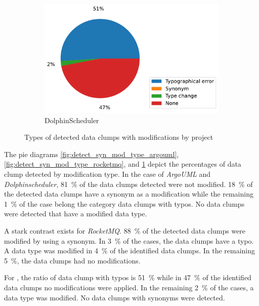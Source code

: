 \begin{figure}[ht!]
        \begin{subfigure}[t]{0.5\columnwidth}
        \includegraphics[width=1.2\columnwidth]{figures/chapter5/detectSyn_mod_type_dolphin.pdf}
        \caption{DolphinScheduler}
        \label{fig:detect_syn_mod_type_dolphinscheduler}
    \end{subfigure}

    \caption{Types of detected data clumps with modifications by project}
    
    \label{fig:detect_syn_mod_type}
\end{figure}


 The pie diagrams  \ref{fig:detect_syn_mod_type_argouml}, \ref{fig:detect_syn_mod_type_rocketmq}, and \ref{fig:detect_syn_mod_type_dolphinscheduler} depict the percentages of data clump detected by modification type. In the case of \textit{ArgoUML} and \textit{Dolphinscheduler}, 81~\% of the  data clumps detected were not modified. 18~\% of the detected data clumps have a synonym as a modification while the remaining 1~\% of the case belong the category data clumps with typos. No data clumps were detected that have a modified data type. 

 A stark contrast exists for \textit{RocketMQ}. 88~\% of the detected data clumps were modified by using a synonym. In 3~\% of the cases, the data clumps have a typo. A data type was modified in 4~\% of the identified data clumps. In the remaining 5~\%, the data clumps had no modifications. 

For \dolphinscheduler, the ratio of data clump with typos is 51~\% while in 47~\% of the identified data clumps no modifications were applied. In the remaining 2~\% of the cases, a data type was modified. No data clumps with synonyms were detected. 



